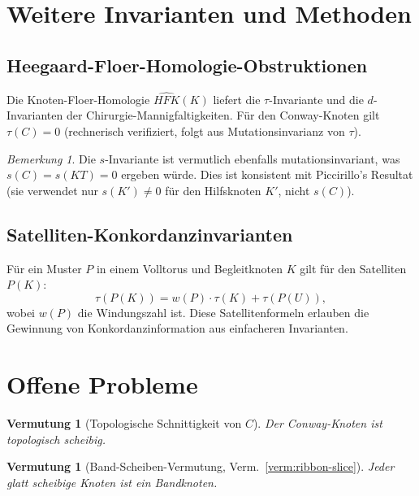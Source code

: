 \documentclass[12pt,a4paper]{amsart}
\newtheorem{vermutung}[theorem]{Vermutung}
\theoremstyle{definition}
\theoremstyle{remark}
\newtheorem{bemerkung}[theorem]{Bemerkung}
\begin{document}
\section{Weitere Invarianten und Methoden}

\subsection{Heegaard-Floer-Homologie-Obstruktionen}

Die Knoten-Floer-Homologie $\widehat{HFK}(K)$ liefert die $\tau$-Invariante
und die $d$-Invarianten der Chirurgie-Mannigfaltigkeiten.
Für den Conway-Knoten gilt $\tau(C) = 0$ (rechnerisch verifiziert,
folgt aus Mutationsinvarianz von $\tau$).

\begin{bemerkung}
Die $s$-Invariante ist vermutlich ebenfalls mutationsinvariant, was
$s(C) = s(KT) = 0$ ergeben würde. Dies ist konsistent mit Piccirillo's
Resultat (sie verwendet nur $s(K') \neq 0$ für den Hilfsknoten $K'$,
nicht $s(C)$).
\end{bemerkung}

\subsection{Satelliten-Konkordanzinvarianten}

Für ein Muster $P$ in einem Volltorus und Begleitknoten $K$ gilt für den
Satelliten $P(K)$:
\[
    \tau(P(K)) = w(P) \cdot \tau(K) + \tau(P(U)),
\]
wobei $w(P)$ die Windungszahl ist. Diese Satellitenformeln erlauben die
Gewinnung von Konkordanzinformation aus einfacheren Invarianten.

\section{Offene Probleme}

\begin{vermutung}[Topologische Schnittigkeit von $C$]
Der Conway-Knoten ist topologisch scheibig.
\end{vermutung}

\begin{vermutung}[Band-Scheiben-Vermutung, Verm.~\ref{verm:ribbon-slice}]
Jeder glatt scheibige Knoten ist ein Bandknoten.
\end{vermutung}
\end{document}
